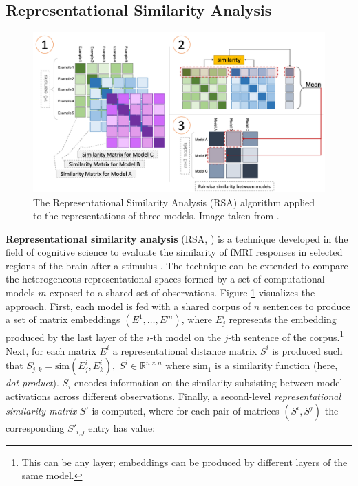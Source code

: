 \documentclass[a4paper, nobind]{templates/ociamthesis}
\begin{document}
\hypertarget{subsubchap:rsa}{%
\subsection{Representational Similarity Analysis}\label{subsubchap:rsa}}



\begin{figure}

{\centering \includegraphics[width=1\linewidth]{figures/2_rsa} 

}

\caption{The Representational Similarity Analysis (RSA) algorithm applied to the representations of three models. Image taken from \textcite{abnar-2020-visualization}.}\label{fig:rsa}
\end{figure}

\textbf{Representational similarity analysis} (RSA, \textcite{laakso-2000-content}) is a technique developed in the field of cognitive science to evaluate the similarity of fMRI responses in selected regions of the brain after a stimulus \autocite{kriegeskorte-etal-2008-representational}. The technique can be extended to compare the heterogeneous representational spaces formed by a set of computational models \(m\) exposed to a shared set of observations. Figure \ref{fig:rsa} visualizes the approach. First, each model is fed with a shared corpus of \(n\) sentences to produce a set of matrix embeddings \((E^1, \dots, E^m)\), where \(E^i_j\) represents the embedding produced by the last layer of the \(i\)-th model on the \(j\)-th sentence of the corpus.\footnote{This can be any layer; embeddings can be produced by different layers of the same model.} Next, for each matrix \(E^i\) a representational distance matrix \(S^i\) is produced such that \(S^i_{j,k} = \text{sim}(E^i_j, E^i_k),\;S^i \in \mathbb{R}^{n \times n}\) where \(\text{sim}_1\) is a similarity function (here, \emph{dot product}). \(S_i\) encodes information on the similarity subsisting between model activations across different observations. Finally, a second-level \emph{representational similarity matrix} \(S'\) is computed, where for each pair of matrices \((S^i, S^j)\) the corresponding \(S'_{i,j}\) entry has value:
\end{document}
